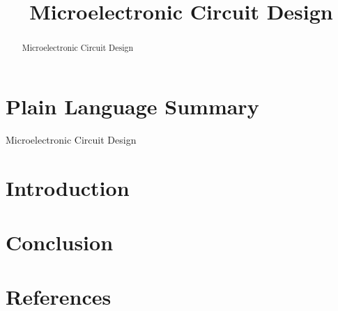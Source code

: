\documentclass[
]{agujournal2019}
\newlength{\cslhangindent}
\newenvironment{CSLReferences}[2] %
 {\begin{list}{}{%
  \setlength{\itemindent}{0pt}
  \setlength{\leftmargin}{0pt}
  \setlength{\parsep}{0pt}
  \ifodd #1
   \setlength{\leftmargin}{\cslhangindent}
   \setlength{\itemindent}{-1\cslhangindent}
  \fi
  \setlength{\itemsep}{#2\baselineskip}}}
 {\end{list}}
\begin{document}
\title{Microelectronic Circuit Design}



\begin{abstract}
Microelectronic Circuit Design
\end{abstract}

\section*{Plain Language Summary}
Microelectronic Circuit Design




\section{Introduction}\label{introduction}

\section{Conclusion}\label{conclusion}

\section*{References}\label{references}

\label{refs}
\begin{CSLReferences}{0}{1}
\vspace{1em}

\end{CSLReferences}
\end{document}

